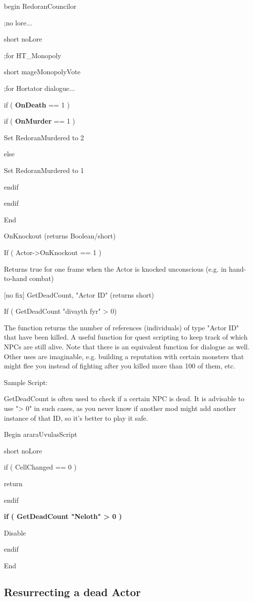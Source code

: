 \documentclass[
]{article}
\begin{document}
begin RedoranCouncilor

;no lore...

short noLore

;for HT\_Monopoly

short mageMonopolyVote

;for Hortator dialogue...

if ( \textbf{OnDeath} == 1 )

if ( \textbf{OnMurder} == 1 )

Set RedoranMurdered to 2

else

Set RedoranMurdered to 1

endif

endif

End

OnKnockout (returns Boolean/short)

If ( Actor-\textgreater OnKnockout == 1 )

Returns true for one frame when the Actor is knocked unconscious (e.g.
in hand-to-hand combat)

{[}no fix{]} GetDeadCount, "Actor ID" (returns short)

If ( GetDeadCount "divayth fyr" \textgreater{} 0)

The function returns the number of references (individuals) of type
"Actor ID" that have been killed. A useful function for quest scripting
to keep track of which NPCs are still alive. Note that there is an
equivalent function for dialogue as well. Other uses are imaginable,
e.g. building a reputation with certain monsters that might flee you
instead of fighting after you killed more than 100 of them, etc.

Sample Script:

GetDeadCount is often used to check if a certain NPC is dead. It is
advisable to use "\textgreater{} 0" in such cases, as you never know if
another mod might add another instance of that ID, so it's better to
play it safe.

Begin araraUvulasScript

short noLore

if ( CellChanged == 0 )

return

endif

\textbf{if ( GetDeadCount "Neloth" \textgreater{} 0 )}

Disable

endif

End

\hypertarget{resurrecting-a-dead-actor}{%
\subsection{\texorpdfstring{\hfill\break
Resurrecting a dead
Actor}{ Resurrecting a dead Actor}}\label{resurrecting-a-dead-actor}}
\end{document}
